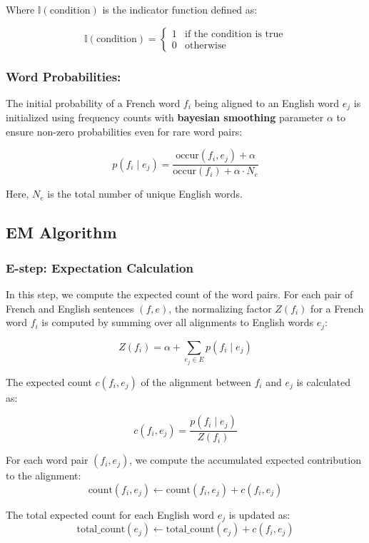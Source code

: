 \documentclass{article}
\begin{document}
Where \( \mathbb{I}(\text{condition}) \) is the indicator function defined as:

\[
\mathbb{I}(\text{condition}) = 
\begin{cases} 
1 & \text{if the condition is true} \\
0 & \text{otherwise} 
\end{cases}
\]

\subsubsection{Word Probabilities:}
The initial probability of a French word \( f_i \) being aligned to an English word \( e_j \) is initialized using frequency counts with \textbf{bayesian smoothing} parameter \( \alpha \) to ensure non-zero probabilities even for rare word pairs:

\[
p(f_i \mid e_j) = \frac{\text{occur}(f_i, e_j) + \alpha}{\text{occur}(f_i) + \alpha \cdot N_e}
\]

Here, \( N_e \) is the total number of unique English words.

\subsection{EM Algorithm}

\subsubsection{E-step: Expectation Calculation}
In this step, we compute the expected count of the word pairs. For each pair of French and English sentences \( (f, e) \), the normalizing factor \( Z(f_i) \) for a French word \( f_i \) is computed by summing over all alignments to English words \( e_j \):

\[
Z(f_i) = \alpha + \sum_{e_j \in E} p(f_i \mid e_j)
\]

The expected count \( c(f_i, e_j) \) of the alignment between \( f_i \) and \( e_j \) is calculated as:

\[
c(f_i, e_j) = \frac{p(f_i \mid e_j)}{Z(f_i)}
\]

For each word pair \( (f_i, e_j) \), we compute the accumulated expected contribution to the alignment:
\[
\text{count}(f_i, e_j) \leftarrow \text{count}(f_i, e_j) + c(f_i, e_j)
\]

The total expected count for each English word \( e_j \) is updated as:
\[
\text{total\_count}(e_j) \leftarrow \text{total\_count}(e_j) + c(f_i, e_j)
\]
\end{document}
